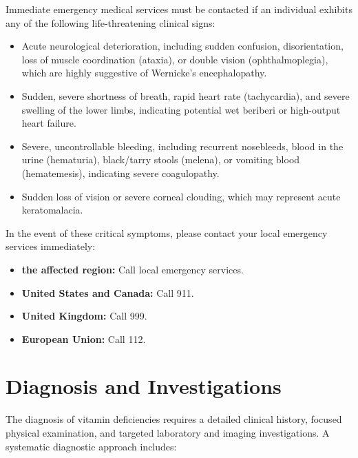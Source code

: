 Immediate emergency medical services must be contacted if an individual exhibits any of the following life-threatening clinical signs:
\begin{itemize}
    \item Acute neurological deterioration, including sudden confusion, disorientation, loss of muscle coordination (ataxia), or double vision (ophthalmoplegia), which are highly suggestive of Wernicke's encephalopathy.
    \item Sudden, severe shortness of breath, rapid heart rate (tachycardia), and severe swelling of the lower limbs, indicating potential wet beriberi or high-output heart failure.
    \item Severe, uncontrollable bleeding, including recurrent nosebleeds, blood in the urine (hematuria), black/tarry stools (melena), or vomiting blood (hematemesis), indicating severe coagulopathy.
    \item Sudden loss of vision or severe corneal clouding, which may represent acute keratomalacia.
\end{itemize}
In the event of these critical symptoms, please contact your local emergency services immediately:
\begin{itemize}
    \item \textbf{the affected region:} Call local emergency services.
    \item \textbf{United States and Canada:} Call 911.
    \item \textbf{United Kingdom:} Call 999.
    \item \textbf{European Union:} Call 112.
\end{itemize}

\section*{Diagnosis and Investigations}
The diagnosis of vitamin deficiencies requires a detailed clinical history, focused physical examination, and targeted laboratory and imaging investigations. A systematic diagnostic approach includes:

